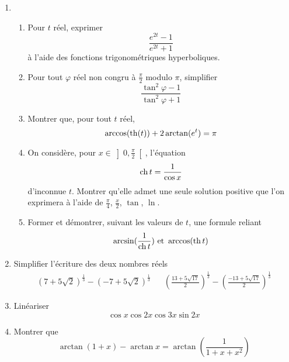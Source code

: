 \begin{enumerate}
\item
\begin{enumerate}
\item  Pour $t$ réel, exprimer 
\begin{displaymath}
\frac{e^{2t}-1}{e^{2t}+1}  
\end{displaymath}
à l'aide des fonctions trigonométriques hyperboliques.

\item Pour tout $\varphi$ r{\'e}el non congru à $\frac{\pi}{2}$ modulo $\pi$, simplifier 
\begin{displaymath}
\frac{\tan ^{2}\varphi -1}{\tan ^{2}\varphi+1}
\end{displaymath}

\item  Montrer que, pour tout $t$ r{\'e}el,
\begin{displaymath}
\arccos (\operatorname{th} (t))+2\arctan (e^{t})=\pi
\end{displaymath}

\item  On considère, pour $x\in \left] 0,\frac{\pi }{2}\right[ $, l'{\'e}quation
\begin{displaymath}
\operatorname{ch} t=\frac{1}{\cos x}
\end{displaymath}
d'inconnue $t$. Montrer qu'elle admet une seule solution positive que l'on exprimera {\`a} l'aide de $\frac{\pi }{4}$, $\frac{x}{2}$, $\tan $, $\ln $.

\item  Former et démontrer, suivant les valeurs de $t$, une formule reliant
\begin{displaymath}
\arcsin (\frac{1}{\operatorname{ch} t})\text{ et }\arccos (\operatorname{th} t)
\end{displaymath}
\end{enumerate}

\item  Simplifier l'{\'e}criture des deux nombres r{\'e}els
\begin{align*}
(7+5\sqrt{2})^{\frac{1}{3}}-(-7+5\sqrt{2})^{\frac{1}{3}}
& &\left( \frac{13+5\sqrt{17}}{2}\right) ^{\frac{1}{3}}-\left( \frac{-13+5\sqrt{17}}{2}\right) ^{\frac{1}{3}}
\end{align*}

\item  Lin{\'e}ariser
\begin{displaymath}
\cos x\cos 2x\cos 3x\sin 2x
\end{displaymath}

\item  Montrer que
\begin{displaymath}
\arctan (1+x)-\arctan x=\arctan (\frac{1}{1+x+x^{2}})
\end{displaymath}
\end{enumerate}

